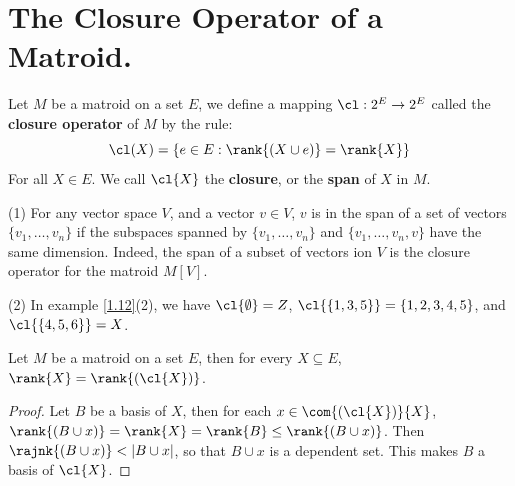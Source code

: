 
\section{The Closure Operator of a Matroid.}

\begin{definition}
    Let $M$ be a matroid on a set $E$, we define a mapping $\cl:2^E \rightarrow
    2^E$ called the \textbf{closure operator} of $M$ by the rule:
    \begin{equation*}
        \cl(X)=\{e \in E : \rank{(X \cup e)}=\rank{X}\}
    \end{equation*}
    For all $X \in E$. We call  $\cl{X}$ the \textbf{closure}, or the
    \textbf{span} of $X$ in  $M$.
\end{definition}

\begin{example}\label{1.14}
    \item[(1)] For any vector space $V$, and a vector  $v \in V$,  $v$ is in the
        span of a set of vectors  $\{v_1, \dots, v_n\}$ if the subspaces spanned
        by $\{v_1, \dots, v_n\}$ and $\{v_1, \dots, v_n,v\}$ have the same
        dimension. Indeed, the span of a subset of vectors ion $V$ is the closure
        operator for the matroid  $M[V]$.

    \item[(2)] In example \ref{1.12}(2), we have $\cl{\emptyset}=Z$,
        $\cl{\{1,3,5\}}=\{1,2,3,4,5\}$, and $\cl{\{4,5,6\}}=X$.
\end{example}

\begin{lemma}\label{1.4.1}
    Let $M$ be a matroid on a set  $E$, then for every $X \subseteq E$,
    $\rank{X}=\rank{(\cl{X})}$.
\end{lemma}
\begin{proof}
    Let $B$ be a basis of  $X$, then for each  $x \in \com{(\cl{X})}{X}$,
    $\rank{(B \cup x)}=\rank{X}=\rank{B} \leq \rank{(B \cup x)}$. Then
    $\rajnk{(B \cup x)}<|B \cup x|$, so that $B \cup x$ is a dependent set. This
    makes  $B$ a basis of  $\cl{X}$.
\end{proof}

